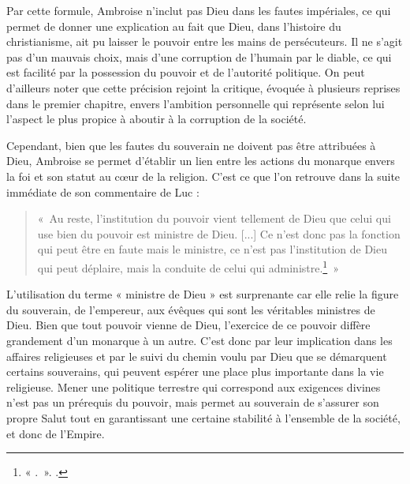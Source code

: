 \bigskip

Par cette formule, Ambroise n'inclut pas Dieu dans les fautes impériales, ce qui permet de donner une explication au fait que Dieu, dans l'histoire du christianisme, ait pu laisser le pouvoir entre les mains de persécuteurs. Il ne s'agit pas d'un mauvais choix, mais d'une corruption de l'humain par le diable, ce qui est facilité par la possession du pouvoir et de l'autorité politique. On peut d'ailleurs noter que cette précision rejoint la critique, évoquée à plusieurs reprises dans le premier chapitre, envers l'ambition personnelle qui représente selon lui l'aspect le plus propice à aboutir à la corruption de la société.

\bigskip

Cependant, bien que les fautes du souverain ne doivent pas être attribuées à Dieu, Ambroise se permet d'établir un lien entre les actions du monarque envers la foi et son statut au cœur de la religion. C'est ce que l'on retrouve dans la suite immédiate de son commentaire de Luc :

\bigskip

\begin{quote}
«~Au reste, l’institution du pouvoir vient tellement de Dieu que celui qui use bien du pouvoir est ministre de Dieu. [...] Ce n’est donc pas la fonction qui peut être en faute mais le ministre, ce n’est pas l’institution de Dieu qui peut déplaire, mais la conduite de celui qui administre.\footnote{« .~». \cite[\nopp IV, 29]{ambroise_csel_32_4}.}~»
\end{quote}

\bigskip

L'utilisation du terme « ministre de Dieu » est surprenante car elle relie la figure du souverain, de l'empereur, aux évêques qui sont les véritables ministres de Dieu. Bien que tout pouvoir vienne de Dieu, l'exercice de ce pouvoir diffère grandement d'un monarque à un autre. C'est donc par leur implication dans les affaires religieuses et par le suivi du chemin voulu par Dieu que se démarquent certains souverains, qui peuvent espérer une place plus importante dans la vie religieuse. Mener une politique terrestre qui correspond aux exigences divines n'est pas un prérequis du pouvoir, mais permet au souverain de s'assurer son propre Salut tout en garantissant une certaine stabilité à l'ensemble de la société, et donc de l'Empire.

